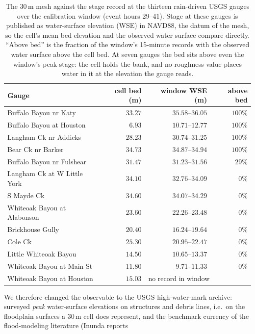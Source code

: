 \documentclass[11pt]{article}
\begin{document}
\begin{table}
\centering\small
\begin{tabular}{@{}lrrr@{}}
\toprule
Gauge & cell bed (m) & window WSE (m) & above bed \\
\midrule
Buffalo Bayou nr Katy & $33.27$ & $35.58$--$36.05$ & $100\%$ \\
Buffalo Bayou at Houston & $6.93$ & $10.71$--$12.77$ & $100\%$ \\
Langham Ck nr Addicks & $28.23$ & $30.74$--$31.25$ & $100\%$ \\
Bear Ck nr Barker & $34.73$ & $34.87$--$34.94$ & $100\%$ \\
Buffalo Bayou nr Fulshear & $31.47$ & $31.23$--$31.56$ & $29\%$ \\
Langham Ck at W Little York & $34.10$ & $32.76$--$34.09$ & $0\%$ \\
S Mayde Ck & $34.60$ & $34.07$--$34.29$ & $0\%$ \\
Whiteoak Bayou at Alabonson & $23.60$ & $22.26$--$23.48$ & $0\%$ \\
Brickhouse Gully & $20.40$ & $16.24$--$19.64$ & $0\%$ \\
Cole Ck & $25.30$ & $20.95$--$22.47$ & $0\%$ \\
Little Whiteoak Bayou & $14.50$ & $10.65$--$13.37$ & $0\%$ \\
Whiteoak Bayou at Main St & $11.80$ & $9.71$--$11.33$ & $0\%$ \\
Whiteoak Bayou at Houston & $15.03$ & \multicolumn{2}{l}{no record in window} \\
\bottomrule
\end{tabular}
\caption{The 30\,m mesh against the stage record at the thirteen
rain-driven USGS gauges over the calibration window (event hours
29--41). Stage at these gauges is published as water-surface elevation
(WSE) in NAVD88, the datum of the mesh, so the cell's mean bed
elevation and the observed water surface compare directly. ``Above
bed'' is the fraction of the window's 15-minute records with the
observed water surface above the cell bed. At seven gauges the bed
sits above even the window's peak stage: the cell holds the bank, and
no roughness value places water in it at the elevation the gauge
reads.}
\label{tab:gauges}
\end{table}
We therefore
changed the observable to the USGS high-water-mark archive: surveyed
\emph{peak} water-surface elevations on structures and debris lines,
i.e.\ on the floodplain surfaces a 30\,m cell does represent, and the
benchmark currency of the flood-modeling literature (Inunda reports
\end{document}
